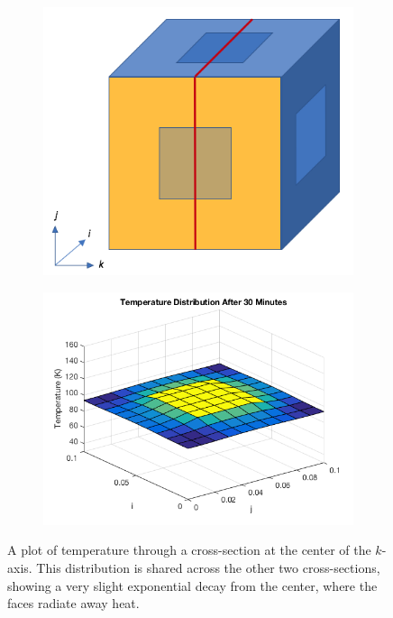 \documentclass[12pt]{article}
\begin{document}
\begin{figure}[h!]
\begin{center}
\begin{subfigure}{0.3\textwidth}
\includegraphics[width=\linewidth]{../pics/centeredkpic.png}
\caption{\label{30minkpic}}
\end{subfigure}
\begin{subfigure}{0.6\textwidth}
\includegraphics[width=\linewidth]{../pics/30mincenteredk.png}
\caption{\label{30mink}}
\end{subfigure}
\caption{\label{30mincenteredk}A plot of temperature through a cross-section at the center of the $k$-axis.  This distribution is shared across the other two cross-sections, showing a very slight exponential decay from the center, where the faces radiate away heat.}
\end{center}
\end{figure}
\end{document}
